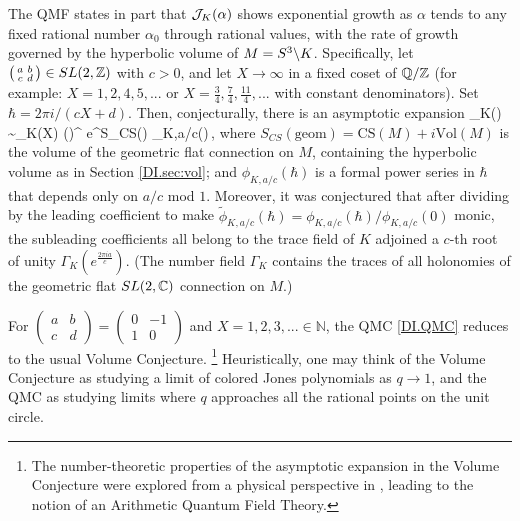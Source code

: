 \documentclass[12pt]{article}
\begin{document}
The QMF states in part that $\mathcal{J}_K(\alpha)$ shows exponential growth as $\alpha$ tends to any fixed rational number $\alpha_0$ through rational values, with the rate of growth governed by the hyperbolic volume of $M=S^3\backslash K$. Specifically, let $\left(\begin{smallmatrix} a&b\\c&d\end{smallmatrix}\right)\in SL(2,{\mathbb Z})$ with $c>0$, and let $X\to\infty$ in a fixed coset of ${\mathbb Q}/{\mathbb Z}$  (for example: $X=1,2,4,5,...$ or $X=\frac34,\frac74,\frac{11}4,...$ with constant denominators). Set $\hbar= 2\pi i/(cX+d)$. Then, conjecturally, there is an asymptotic expansion
%
\DIbe \CalJ_K\left(\right) \sim \CalJ_K(X) \left(\right)^{} e^{S_{CS}()} \phi_{K,a/c}(\hbar)\,, \label{DI.QMC} \DIee
%
where $S_{CS}(\text{geom}) = \text{CS}(M)+i\text{Vol}(M)$ is the volume of the geometric flat connection on $M$, containing the hyperbolic volume as in Section \ref{DI.sec:vol}; and  $\phi_{K,a/c}(\hbar)$ is a formal power series in $\hbar$ that depends only on $a/c$ mod $1$. Moreover, it was conjectured that after dividing by the leading coefficient to make $\widetilde \phi_{K,a/c}(\hbar) =  \phi_{K,a/c}(\hbar)/ \phi_{K,a/c}(0)$ monic, the subleading coefficients all belong to the trace field of $K$ adjoined a $c$-th root of unity $\Gamma_K(e^{\frac{2\pi i a}{c}})$. (The number field $\Gamma_K$ contains the traces of all holonomies of the geometric flat $SL(2,{\mathbb C})$ connection on $M$.)

For $\left(\begin{smallmatrix} a&b\\c&d\end{smallmatrix}\right) = \left(\begin{smallmatrix} 0&-1\\1&0\end{smallmatrix}\right)$ and $X=1,2,3,...\in \mathbb N$, the QMC \eqref{DI.QMC} reduces to the usual Volume Conjecture.%
%
\footnote{The number-theoretic properties of the asymptotic expansion in the Volume Conjecture were explored from a physical perspective in \cite{DIDGLZ}, leading to the notion of an Arithmetic Quantum Field Theory.} %
%
Heuristically, one may think of the Volume Conjecture as studying a limit of colored Jones polynomials as $q\to 1$, and the QMC as studying limits where $q$ approaches all the rational points on the unit circle.
\end{document}
